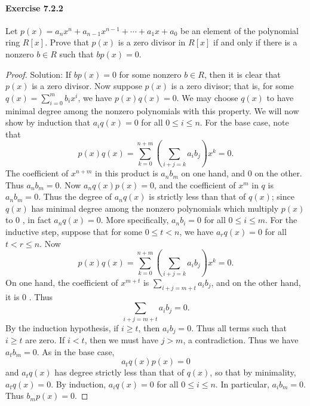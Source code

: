 \documentclass{article}
\theoremstyle{definition}
\begin{document}
\paragraph{Exercise 7.2.2} Let $p(x)=a_{n} x^{n}+a_{n-1} x^{n-1}+\cdots+a_{1} x+a_{0}$ be an element of the polynomial ring $R[x]$. Prove that $p(x)$ is a zero divisor in $R[x]$ if and only if there is a nonzero $b \in R$ such that $b p(x)=0$.
\begin{proof}
    Solution: If $b p(x)=0$ for some nonzero $b \in R$, then it is clear that $p(x)$ is a zero divisor.
Now suppose $p(x)$ is a zero divisor; that is, for some $q(x)=\sum_{i=0}^m b_i x^i$, we have $p(x) q(x)=0$. We may choose $q(x)$ to have minimal degree among the nonzero polynomials with this property.
We will now show by induction that $a_i q(x)=0$ for all $0 \leq i \leq n$.
For the base case, note that
$$
p(x) q(x)=\sum_{k=0}^{n+m}\left(\sum_{i+j=k} a_i b_j\right) x^k=0 .
$$
The coefficient of $x^{n+m}$ in this product is $a_n b_m$ on one hand, and 0 on the other. Thus $a_n b_m=0$. Now $a_n q(x) p(x)=0$, and the coefficient of $x^m$ in $q$ is $a_n b_m=0$. Thus the degree of $a_n q(x)$ is strictly less than that of $q(x)$; since $q(x)$ has minimal degree among the nonzero polynomials which multiply $p(x)$ to 0 , in fact $a_n q(x)=0$. More specifically, $a_n b_i=0$ for all $0 \leq i \leq m$.
For the inductive step, suppose that for some $0 \leq t<n$, we have $a_r q(x)=0$ for all $t<r \leq n$. Now
$$
p(x) q(x)=\sum_{k=0}^{n+m}\left(\sum_{i+j=k} a_i b_j\right) x^k=0 .
$$
On one hand, the coefficient of $x^{m+t}$ is $\sum_{i+j=m+t} a_i b_j$, and on the other hand, it is 0 . Thus
$$
\sum_{i+j=m+t} a_i b_j=0 .
$$
By the induction hypothesis, if $i \geq t$, then $a_i b_j=0$. Thus all terms such that $i \geq t$ are zero. If $i<t$, then we must have $j>m$, a contradiction. Thus we have $a_t b_m=0$. As in the base case,
$$
a_t q(x) p(x)=0
$$
and $a_t q(x)$ has degree strictly less than that of $q(x)$, so that by minimality, $a_t q(x)=0$.
By induction, $a_i q(x)=0$ for all $0 \leq i \leq n$. In particular, $a_i b_m=0$. Thus $b_m p(x)=0$.
\end{proof}
\end{document}
